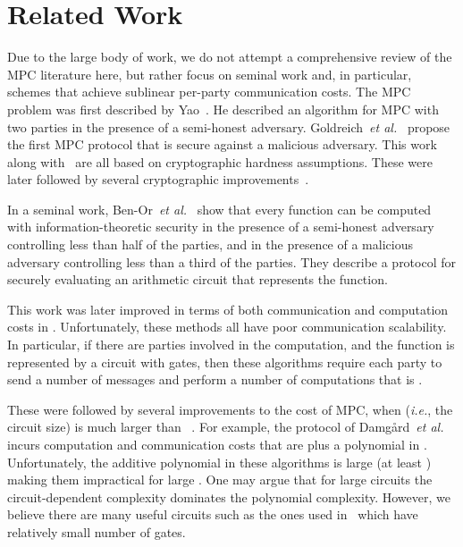 \documentclass[11pt,letter]{article}
\newcommand{\ie}{\emph{i.e.}}
\newcommand{\etal}{\emph{et al.}}
\theoremstyle{mytheoremstyle}
\begin{document}
\section{Related Work} \label{sec:relatedwork}
Due to the large body of work, we do not attempt a comprehensive review of the MPC literature here, but rather focus on seminal work and, in particular, schemes that achieve sublinear per-party communication costs.
The MPC problem was first described by Yao~\cite{Yao:1982:PSC:1382436.1382751}. He described an algorithm for MPC with two parties in the presence of a semi-honest adversary. Goldreich~\etal~\cite{Goldreich:1987:PAM:28395.28420} propose the first MPC protocol that is secure against a malicious adversary. This work along with~\cite{Chaum:1987:MCE:646752.704756,Galil:1987:CCS:646752.704741} are all based on cryptographic hardness assumptions. These were later followed by several cryptographic improvements~\cite{Beaver:1990:RCS:100216.100287,Gennaro:1998:SVF:277697.277716,Canetti:1996:ASM:888604}.

In a seminal work, Ben-Or~\etal~\cite{bgw88} show that every function can be computed with information-theoretic security in the presence of a semi-honest adversary controlling less than half of the parties, and in the presence of a malicious adversary controlling less than a third of the parties. They describe a protocol for securely evaluating an arithmetic circuit that represents the function. 

This work was later improved in terms of both communication and computation costs in \cite{chaum_crepeau_damgard:multiparty,Beaver:1991,Gennaro:1998:SVF:277697.277716}. Unfortunately, these methods all have poor communication scalability. In particular, if there are  parties involved in the computation, and the function  is represented by a circuit with  gates, then these algorithms require each party to send a number of messages and perform a number of computations that is .

These were followed by several improvements to the cost of MPC, when  (\ie, the circuit size) is much larger than ~\cite{damgard2006scalable,damgard2007scalable,damgard2008scalable}. For example, the protocol of Damg{\aa}rd~\etal~\cite{damgard2008scalable} incurs computation and communication costs that are  plus a polynomial in . Unfortunately, the additive polynomial in these algorithms is large (at least ) making them impractical for large . One may argue that for large circuits the circuit-dependent complexity dominates the polynomial complexity. However, we believe there are many useful circuits such as the ones used in~\cite{msz:sirocco:2015,Hamada:2012:MPCSorting} which have relatively small number of gates.
\end{document}
